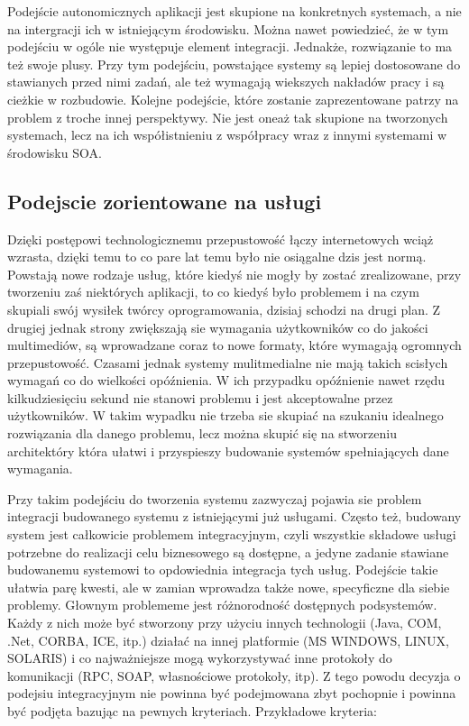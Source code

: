 Podejście autonomicznych aplikacji jest  skupione na konkretnych systemach, a nie na intergracji ich w istniejącym środowisku. Można nawet powiedzieć, że w tym podejściu w ogóle nie występuje element integracji. Jednakże, rozwiązanie to ma też swoje plusy. Przy tym podejściu, powstające systemy są lepiej dostosowane do stawianych przed nimi zadań, ale też wymagają wiekszych nakładów pracy i są cieżkie w rozbudowie. Kolejne podejście, które zostanie zaprezentowane  patrzy na problem z troche innej perspektywy. Nie jest oneaż tak  skupione na tworzonych systemach, lecz na ich współistnieniu z współpracy wraz z innymi systemami w środowisku SOA.

\subsection {Podejscie zorientowane na usługi}
Dzięki postępowi technologicznemu przepustowość łączy internetowych wciąż wzrasta, dzięki temu to co pare lat temu było nie osiągalne dzis jest normą. Powstają nowe rodzaje usług, które kiedyś nie mogły by zostać zrealizowane, przy tworzeniu zaś niektórych aplikacji, to co kiedyś było problemem i na czym skupiali swój wysiłek twórcy oprogramowania, dzisiaj schodzi na drugi plan. Z drugiej jednak strony zwiększają sie wymagania użytkowników co do jakości multimediów, są wprowadzane coraz to nowe formaty, które wymagają ogromnych przepustowość. Czasami jednak systemy mulitmedialne nie mają takich scisłych wymagań co do wielkości opóźnienia. W ich przypadku opóźnienie nawet rzędu kilkudziesięciu sekund nie stanowi problemu i jest akceptowalne przez użytkowników. W takim wypadku nie trzeba sie skupiać na szukaniu idealnego rozwiązania dla danego problemu, lecz można skupić się na stworzeniu architektóry która ułatwi i przyspieszy budowanie systemów spełniających dane wymagania.

Przy takim podejściu do tworzenia systemu zazwyczaj pojawia sie problem integracji budowanego systemu z istniejącymi już usługami. Często też, budowany system jest całkowicie problemem integracyjnym, czyli wszystkie składowe usługi potrzebne do realizacji celu biznesowego są dostępne, a jedyne zadanie stawiane budowanemu systemowi to opdowiednia integracja tych usług. Podejście takie ułatwia parę kwesti, ale w zamian wprowadza także nowe, specyficzne dla siebie problemy. Głownym problememe jest różnorodność dostępnych podsystemów. Każdy z nich może być stworzony przy użyciu innych technologii (Java, COM, .Net, CORBA, ICE, itp.) działać na innej platformie (MS WINDOWS, LINUX, SOLARIS) i co najważniejsze mogą wykorzystywać inne protokoły do komunikacji (RPC, SOAP, własnościowe protokoły, itp). Z tego powodu decyzja o podejsiu integracyjnym nie powinna być podejmowana zbyt pochopnie i powinna być podjęta bazując na pewnych kryteriach. Przykładowe kryteria:  \cite{hohpewoolf2003} 

